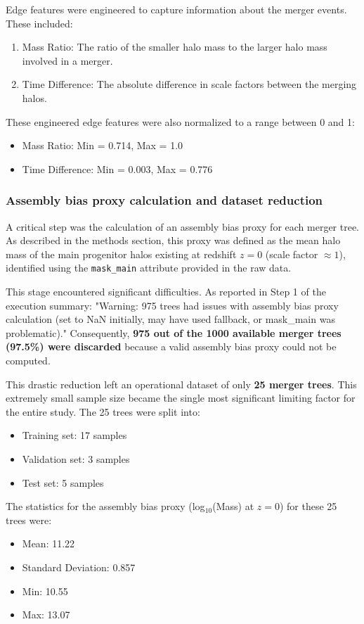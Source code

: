 \documentclass[twocolumn]{aastex631}
\begin{document}
Edge features were engineered to capture information about the merger events. These included:
\begin{enumerate}
    \item Mass Ratio: The ratio of the smaller halo mass to the larger halo mass involved in a merger.
    \item Time Difference: The absolute difference in scale factors between the merging halos.
\end{enumerate}
These engineered edge features were also normalized to a range between 0 and 1:
\begin{itemize}
    \item Mass Ratio: Min = 0.714, Max = 1.0
    \item Time Difference: Min = 0.003, Max = 0.776
\end{itemize}

\subsubsection{Assembly bias proxy calculation and dataset reduction}
A critical step was the calculation of an assembly bias proxy for each merger tree. As described in the methods section, this proxy was defined as the mean halo mass of the main progenitor halos existing at redshift $z=0$ (scale factor $\approx 1$), identified using the \texttt{mask\_main} attribute provided in the raw data.

This stage encountered significant difficulties. As reported in Step 1 of the execution summary: "Warning: 975 trees had issues with assembly bias proxy calculation (set to NaN initially, may have used fallback, or mask\_main was problematic)." Consequently, \textbf{975 out of the 1000 available merger trees (97.5\%) were discarded} because a valid assembly bias proxy could not be computed.

This drastic reduction left an operational dataset of only \textbf{25 merger trees}. This extremely small sample size became the single most significant limiting factor for the entire study. The 25 trees were split into:
\begin{itemize}
    \item Training set: 17 samples
    \item Validation set: 3 samples
    \item Test set: 5 samples
\end{itemize}

The statistics for the assembly bias proxy (log$_{10}$(Mass) at $z=0$) for these 25 trees were:
\begin{itemize}
    \item Mean: 11.22
    \item Standard Deviation: 0.857
    \item Min: 10.55
    \item Max: 13.07
\end{itemize}
\end{document}

